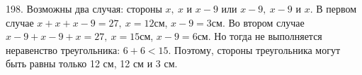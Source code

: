 198. Возможны два случая: стороны $x,\ x$ и $x-9$ или $x-9,\ x-9$ и $x.$ В первом случае $x+x+x-9=27,\ x=12$см, $x-9=3$см. Во втором случае $x-9+x-9+x=27,\ x=15$см, $x-9=6$см. Но тогда не выполняется неравенство треугольника: $6+6<15.$ Поэтому, стороны треугольника могут быть равны только 12 см, 12 см и 3 см.\\
